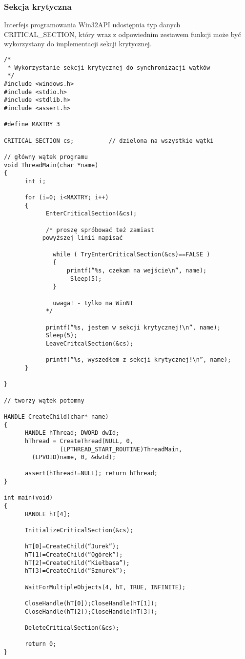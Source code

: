 \subsubsection{Sekcja krytyczna} 

Interfejs programowania Win32API udostępnia typ danych CRITICAL\_SECTION, 
który wraz z odpowiednim zestawem funkcji może być wykorzystany do implementacji sekcji krytycznej. 

\begin{scriptsize}
\begin{verbatim}
/*
 * Wykorzystanie sekcji krytycznej do synchronizacji wątków
 */
#include <windows.h>  
#include <stdio.h>  
#include <stdlib.h>  
#include <assert.h>  

#define MAXTRY 3  

CRITICAL_SECTION cs;          // dzielona na wszystkie wątki  
  
// główny wątek programu  
void ThreadMain(char *name)  
{  
      int i;  

      for (i=0; i<MAXTRY; i++)  
      {  
            EnterCriticalSection(&cs);  

            /* proszę spróbować też zamiast 
	       powyższej linii napisać 
			
   			  while ( TryEnterCriticalSection(&cs)==FALSE )  
              {  
                  printf(“%s, czekam na wejście\n”, name);   
                   Sleep(5); 
              }
              
			  uwaga! - tylko na WinNT
            */  

            printf(“%s, jestem w sekcji krytycznej!\n”, name);  
            Sleep(5);  
            LeaveCritcalSection(&cs);  

            printf(“%s, wyszedłem z sekcji krytycznej!\n”, name);  
      }  

}  

// tworzy wątek potomny  

HANDLE CreateChild(char* name)  
{  
      HANDLE hThread; DWORD dwId;  
      hThread = CreateThread(NULL, 0, 
                (LPTHREAD_START_ROUTINE)ThreadMain, 
		(LPVOID)name, 0, &dwId);  

      assert(hThread!=NULL); return hThread;            
}  

int main(void)  
{  
      HANDLE hT[4]; 

      InitializeCriticalSection(&cs);  

      hT[0]=CreateChild(“Jurek”);  
      hT[1]=CreateChild(“Ogórek”);  
      hT[2]=CreateChild(“Kiełbasa”);  
      hT[3]=CreateChild(“Sznurek”);  

      WaitForMultipleObjects(4, hT, TRUE, INFINITE);  

      CloseHandle(hT[0]);CloseHandle(hT[1]);  
      CloseHandle(hT[2]);CloseHandle(hT[3]);  

      DeleteCriticalSection(&cs);  

      return 0;  
}  
\end{verbatim}
\end{scriptsize}

